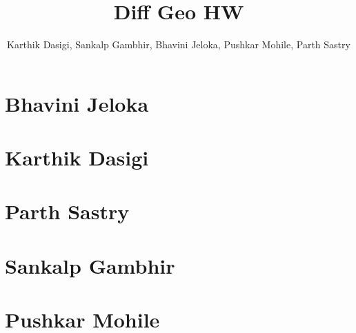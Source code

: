 \documentclass[aspectratio=169, handout]{beamer}
\title{Diff Geo HW}
\author{ %
    Karthik Dasigi,
    Sankalp Gambhir,
    Bhavini Jeloka,
    Pushkar Mohile, 
    Parth Sastry
}
\begin{document}
    \frame{\titlepage}

    \section{Bhavini Jeloka}
    
    

    \section{Karthik Dasigi}
    
    

    \section{Parth Sastry}
    
    

    \section{Sankalp Gambhir}
    
    

    \section{Pushkar Mohile}
    
\end{document}
